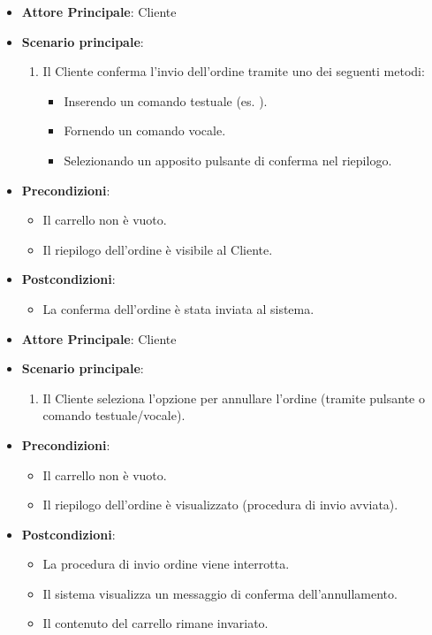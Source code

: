 \label{uc_26.3}
\begin{itemize}
    \item \textbf{Attore Principale}: Cliente
    \item \textbf{Scenario principale}:
    \begin{enumerate}
        \item Il Cliente conferma l'invio dell'ordine tramite uno dei seguenti metodi:
        \begin{itemize}
            \item Inserendo un comando testuale (es. ).
            \item Fornendo un comando vocale.
            \item Selezionando un apposito pulsante di conferma nel riepilogo.
        \end{itemize}
    \end{enumerate}
    \item \textbf{Precondizioni}:
    \begin{itemize}
        \item Il carrello non è vuoto.
        \item Il riepilogo dell'ordine è visibile al Cliente.
    \end{itemize}
    \item \textbf{Postcondizioni}:
    \begin{itemize}
        \item La conferma dell'ordine è stata inviata al sistema.
    \end{itemize}
\end{itemize}

\label{uc_26.4}
\begin{itemize}
    \item \textbf{Attore Principale}: Cliente
    \item \textbf{Scenario principale}:
    \begin{enumerate}
        \item Il Cliente seleziona l'opzione per annullare l'ordine (tramite pulsante o comando testuale/vocale).
    \end{enumerate}
    \item \textbf{Precondizioni}:
    \begin{itemize}
        \item Il carrello non è vuoto.
        \item Il riepilogo dell'ordine è visualizzato (procedura di invio avviata).
    \end{itemize}
    \item \textbf{Postcondizioni}:
    \begin{itemize}
        \item La procedura di invio ordine viene interrotta.
        \item Il sistema visualizza un messaggio di conferma dell'annullamento.
        \item Il contenuto del carrello rimane invariato.
    \end{itemize}
\end{itemize}